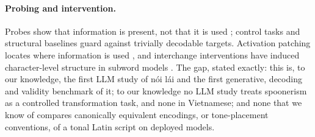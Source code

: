 \paragraph{Probing and intervention.}
Probes show that information is present, not that it is used \citep{2022-cl-1-7,2021-eacl-main-295}; control tasks \citep{D19-1275} and structural baselines guard against trivially decodable targets. Activation patching locates where information is used \citep{meng-etal-2022-locating,heimersheim-nanda-2024-use,2021-acl-long-144,2024-acl-long-785}, and interchange interventions have induced character-level structure in subword models \citep{2023-findings-acl-770}. The gap, stated exactly: this is, to our knowledge, the first LLM study of nói lái and the first generative, decoding and validity benchmark of it; to our knowledge no LLM study treats spoonerism as a controlled transformation task, and none in Vietnamese; and none that we know of compares canonically equivalent encodings, or tone-placement conventions, of a tonal Latin script on deployed models.
